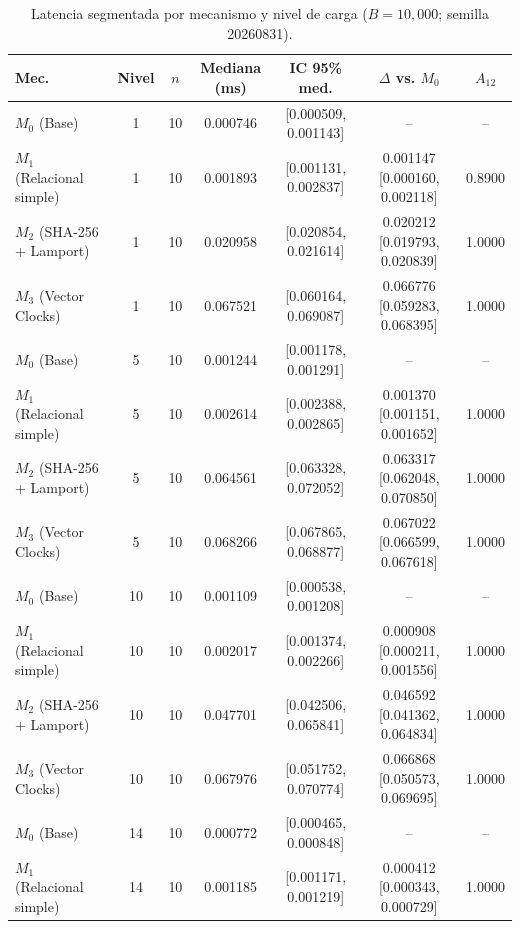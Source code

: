 \begin{table}[H]
\centering
\scriptsize
\caption{Latencia segmentada por mecanismo y nivel de carga ($B=10{,}000$; semilla 20260831).}
\label{tab:estadistica-inferencial}
\begin{tabular}{|l|c|c|c|c|c|c|}
\hline
\textbf{Mec.} & \textbf{Nivel} & \textbf{$n$} & \textbf{Mediana (ms)} & \textbf{IC 95\% med.} & \textbf{$\Delta$ vs. $M_0$} & \textbf{$A_{12}$} \\
\hline
$M_0$ (Base) & 1 & 10 & 0.000746 & [0.000509, 0.001143] & -- & -- \\
\hline
$M_1$ (Relacional simple) & 1 & 10 & 0.001893 & [0.001131, 0.002837] & 0.001147 [0.000160, 0.002118] & 0.8900 \\
\hline
$M_2$ (SHA-256 + Lamport) & 1 & 10 & 0.020958 & [0.020854, 0.021614] & 0.020212 [0.019793, 0.020839] & 1.0000 \\
\hline
$M_3$ (Vector Clocks) & 1 & 10 & 0.067521 & [0.060164, 0.069087] & 0.066776 [0.059283, 0.068395] & 1.0000 \\
\hline
$M_0$ (Base) & 5 & 10 & 0.001244 & [0.001178, 0.001291] & -- & -- \\
\hline
$M_1$ (Relacional simple) & 5 & 10 & 0.002614 & [0.002388, 0.002865] & 0.001370 [0.001151, 0.001652] & 1.0000 \\
\hline
$M_2$ (SHA-256 + Lamport) & 5 & 10 & 0.064561 & [0.063328, 0.072052] & 0.063317 [0.062048, 0.070850] & 1.0000 \\
\hline
$M_3$ (Vector Clocks) & 5 & 10 & 0.068266 & [0.067865, 0.068877] & 0.067022 [0.066599, 0.067618] & 1.0000 \\
\hline
$M_0$ (Base) & 10 & 10 & 0.001109 & [0.000538, 0.001208] & -- & -- \\
\hline
$M_1$ (Relacional simple) & 10 & 10 & 0.002017 & [0.001374, 0.002266] & 0.000908 [0.000211, 0.001556] & 1.0000 \\
\hline
$M_2$ (SHA-256 + Lamport) & 10 & 10 & 0.047701 & [0.042506, 0.065841] & 0.046592 [0.041362, 0.064834] & 1.0000 \\
\hline
$M_3$ (Vector Clocks) & 10 & 10 & 0.067976 & [0.051752, 0.070774] & 0.066868 [0.050573, 0.069695] & 1.0000 \\
\hline
$M_0$ (Base) & 14 & 10 & 0.000772 & [0.000465, 0.000848] & -- & -- \\
\hline
$M_1$ (Relacional simple) & 14 & 10 & 0.001185 & [0.001171, 0.001219] & 0.000412 [0.000343, 0.000729] & 1.0000 \\

\end{tabular}
\end{table}
